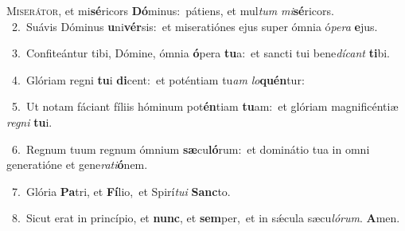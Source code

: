 \lettrine{\initial\textcolor{\initialcolor}{M}}{iserátor,} et mi\-\textbf{sé}\-ricors \textbf{Dó}\-minus:~\star pátiens, et mul\textit{tum} \textit{mi}\-\textbf{sé}ricors.\\
{\numbfont\textcolor{\numbcolor}{~2.}}~Suávis Dóminus \textbf{u}\-ni\-\textbf{vér}\-sis:~\star et miseratiónes ejus super ómnia ó\-\textit{pe}\-\textit{ra} \textbf{e}\-jus.\par
{\numbfont\textcolor{\numbcolor}{~3.}}~Confiteántur tibi, Dómine, ómnia \textbf{ó}\-pera \textbf{tu}\-a:~\star et sancti tui bene\-\textit{dí}\-\textit{cant} \textbf{ti}\-bi.\par
{\numbfont\textcolor{\numbcolor}{~4.}}~Glóriam regni \textbf{tu}\-i \textbf{di}\-cent:~\star et poténtiam tu\textit{am} \textit{lo}\-\textbf{quén}tur:\par
{\numbfont\textcolor{\numbcolor}{~5.}}~Ut notam fáciant fíliis hóminum pot\-\textbf{én}\-tiam \textbf{tu}\-am:~\star et glóriam magnificéntiæ \textit{re}\-\textit{gni} \textbf{tu}\-i.\par
{\numbfont\textcolor{\numbcolor}{~6.}}~Regnum tuum regnum ómnium \textbf{sæ}\-cu\-\textbf{ló}\-rum:~\star et dominátio tua in omni generatióne et gene\-\textit{ra}\-\textit{ti}\textbf{ó}nem.\par
{\numbfont\textcolor{\numbcolor}{~7.}}~Glória \textbf{Pa}\-tri, et \textbf{Fí}\-lio,~\star et Spirí\-\textit{tu}\-\textit{i} \textbf{Sanc}\-to.\par
{\numbfont\textcolor{\numbcolor}{~8.}}~Sicut erat in princípio, et \textbf{nunc}\-, et \textbf{sem}\-per,~\star et in sǽcula sæcu\-\textit{ló}\-\textit{rum}. \textbf{A}\-men.\par
